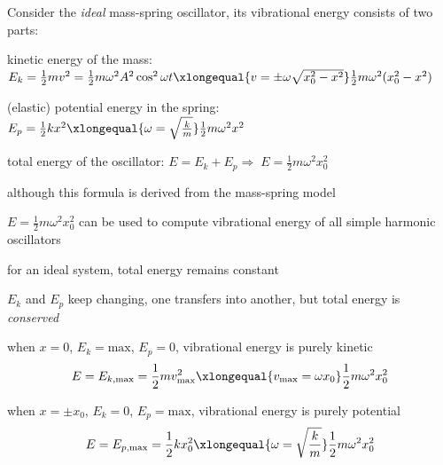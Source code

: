 \documentclass[a4paper,12pt]{book}
\newcommand{\cmt}{}
\newcommand{\tmax}{\text{max}}
\newcommand{\RA}{\Rightarrow\;}
\newcommand{\tcbhighmath}[1]{\boxed{#1}}
\newcommand{\cmt}{}
\begin{document}
Consider the \emph{ideal} mass-spring oscillator, its vibrational energy consists of two parts:

\begin{compactitem}
	\item[-] kinetic energy of the mass: $E_k = \frac{1}{2} mv^2 = \frac{1}{2} m \omega^2 A^2 \cos^2\omega t \xlongequal{v=\pm\omega\sqrt{x_0^2-x^2}} \frac{1}{2}m\omega^2 (x_0^2-x^2)$
	
	\item[-] (elastic) potential energy in the spring: $E_p = \frac{1}{2} kx^2  \xlongequal{\omega = \sqrt{\frac{k}{m}}} \frac{1}{2}m\omega^2 x^2$
\end{compactitem}

total energy of the oscillator: $E = E_k + E_p \RA \tcbhighmath{E = \frac{1}{2}m\omega^2x_0^2}$

\cmt although this formula is derived from the mass-spring model

$E = \frac{1}{2}m\omega^2x_0^2$ can be used to compute vibrational energy of all simple harmonic oscillators

\cmt for an ideal system, total energy remains constant

$E_k$ and $E_p$ keep changing, one transfers into another, but total energy is \emph{conserved}

\cmt when $x=0$, $E_k = \tmax$, $E_p=0$, vibrational energy is purely kinetic
\begin{equation*}
	E=E_{k,\tmax}=\frac{1}{2}mv_\tmax^2 \xlongequal{v_\tmax = \omega x_0} \frac{1}{2}m\omega^2x_0^2
\end{equation*}

\cmt when $x=\pm x_0$, $E_k = 0$, $E_p=\tmax$, vibrational energy is purely potential
\begin{equation*}
	E=E_{p,\tmax}=\frac{1}{2}kx_0^2 \xlongequal{\omega=\sqrt{\frac{k}{m}}} \frac{1}{2}m\omega^2x_0^2
\end{equation*}
\end{document}

